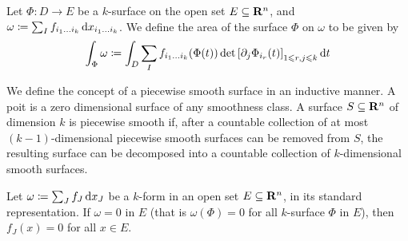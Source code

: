 \begin{definition}
\label{def:k-surface-area}
Let \(\Phi: D \to E\) be a \(k\)-surface on the open set \(E \subseteq \mathbf{R}^n\),
and \(\omega \coloneq \sum_I f_{i_1 \dots i_k}\, \mathrm{d} x_{i_1 \dots i_k}\). We
define the area of the surface \(\Phi\) on \(\omega\) to be given by
\[
  \int_{\Phi} \omega
  \coloneq \int_D \sum_I f_{i_1 \dots i_k}(\Phi(t))
  \det {\left[ \partial_j \Phi_{i_r}(t) \right]}_{1 \leqslant r, j \leqslant k}
  \, \mathrm{d} t
\]
\end{definition}

\begin{definition}
\label{def:piecewise-smooth-surface}
We define the concept of a piecewise smooth surface in an inductive manner. A
poit is a zero dimensional surface of any smoothness class. A surface \(S
\subseteq \mathbf{R}^n\) of dimension \(k\) is piecewise smooth if, after a countable
collection of at most \((k-1)\)-dimensional piecewise smooth surfaces can be
removed from \(S\), the resulting surface can be decomposed into a countable
collection of \(k\)-dimensional smooth surfaces.
\end{definition}

\begin{theorem}
\label{thm:zero-form-standard-representation}
Let \(\omega \coloneq \sum_J f_J\, \mathrm{d} x_J\) be a \(k\)-form in an open set
\(E \subseteq \mathbf{R}^{n}\), in its standard representation. If \(\omega = 0\) in
\(E\) (that is \(\omega(\Phi) = 0\) for all \(k\)-surface \(\Phi\) in \(E\)),
then \(f_J(x) = 0\) for all \(x \in E\).
\end{theorem}

